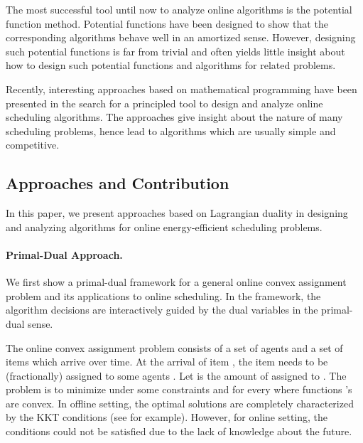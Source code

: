 \documentclass[11pt]{article}
\begin{document}
The most successful tool until now to analyze online algorithms 
is the potential function method. 
Potential functions have been designed to show that the corresponding algorithms behave
well in an amortized sense. However, designing such potential functions is far from trivial and often
yields little insight about how to design such potential functions and algorithms for related problems. 

Recently, interesting approaches 
\cite{AnandGarg12:Resource-augmentation,GuptaKrishnaswamy12:Online-Primal-Dual,Thang13:Lagrangian-Duality} 
based on mathematical programming have been presented 
in the search for a principled tool to design and analyze online scheduling algorithms. 
The approaches give insight about the nature of many scheduling problems,
hence lead to algorithms which are usually simple and competitive.


\subsection{Approaches and Contribution}	
In this paper, we present approaches based on Lagrangian duality in designing and analyzing 
algorithms for online energy-efficient scheduling problems. 

\paragraph{Primal-Dual Approach.} We first show a primal-dual framework for a general online 
convex assignment problem and its applications to online scheduling. In the framework, the algorithm 
decisions are interactively guided by the dual variables in the primal-dual sense. 

The online convex assignment problem consists of a set of agents and a set of items which arrive over time.
At the arrival of item , the item needs to be (fractionally) assigned to some agents . 
Let  is the amount of  assigned to .
The problem is to minimize   
under some constraints 
and  for every  where functions 's are convex.
In offline setting, the optimal solutions are completely characterized by 
the KKT conditions (see \cite{BoydVandenberghe04:Convex-Optimization} for example).
However, for online setting, the conditions could not be satisfied due to the lack of knowledge
about the future. 
\end{document}
